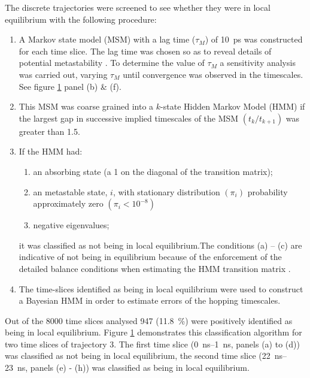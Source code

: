 \begin{figure}[p]
    \label{fig:wat_s10}
\end{figure}

The discrete trajectories were screened to see whether they were in local equilibrium with the following procedure:
\begin{enumerate}
    \item A Markov state model (MSM) with a lag time ($\tau_{M}$) of \SI{10}{\pico\second} was constructed for each time slice. The lag time was chosen so as to reveal details of potential metastability \cite{prinzMarkovModelsMolecular2011}. To determine the value of $\tau_{M}$  a sensitivity analysis was carried out, varying $\tau_{M}$ until convergence was observed  in the timescales. See figure \ref{fig:wat_s10} panel (b) \& (f).
    \item This MSM was coarse grained into a $k$-state Hidden Markov Model (HMM) if the largest gap in successive implied timescales of the MSM $\left(t_{k} / t_{k+1}\right)$ was greater than \num{1.5}. 
    \item If the HMM had:
    \begin{enumerate}
        \item an absorbing state (a \num{1} on the diagonal of the transition matrix);
        \item an metastable state, $i$, with stationary distribution $\left(\pi_{i}\right)$ probability approximately zero $\left(\pi_{i}< 10^{-8}\right)$
        \item negative eigenvalues; 
    \end{enumerate}
    it was classified as not being in local equilibrium.The conditions (a) – (c) are indicative of not being in equilibrium because of the enforcement of the detailed balance conditions when estimating the HMM transition matrix \cite{noeProjectedHiddenMarkov2013a}.
    \item The time-slices identified as being in local equilibrium were used to construct a Bayesian HMM in order to estimate errors of the hopping timescales. 
\end{enumerate}

Out of the \num{8000} time slices analysed \num{947} (\SI{11.8}{\percent}) were positively identified as being in local equilibrium. Figure \ref{fig:wat_s10} demonstrates this classification algorithm for two time slices of trajectory \num{3}. The first time slice (\SIrange{0}{1}{\nano\second}, panels (a) to (d)) was classified as not being in local equilibrium, the second time slice (\SIrange{22}{23}{\nano\second}, panels (e) - (h)) was classified as being in local equilibrium.

